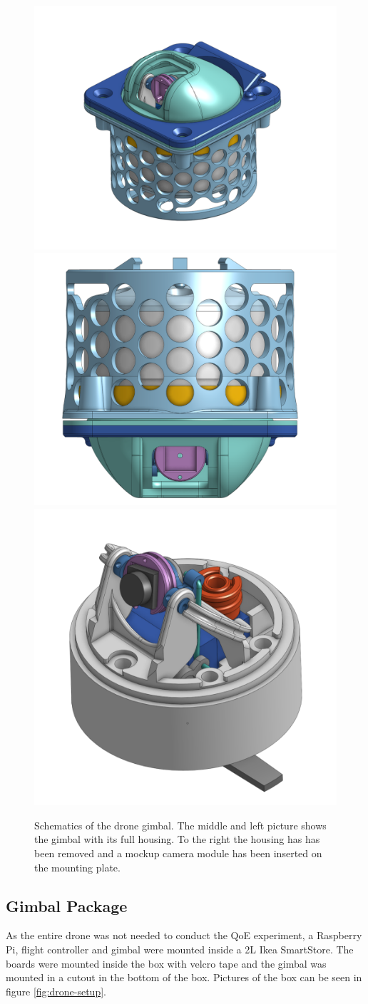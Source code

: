 \documentclass[nofilelist]{cslthse-msc}
\begin{document}
\begin{description}
   \begin{figure}[htp]
      \centering
      \includegraphics[width=.3\textwidth]{images/gimbal-1.png}\hfill
      \includegraphics[width=.3\textwidth]{images/gimbal-2.png}\hfill
      \includegraphics[width=.3\textwidth]{images/gimbal-3.png}
      \caption{Schematics of the drone gimbal. The middle and left picture shows the gimbal with its full housing. To the right the housing has has been removed and a mockup camera module has been inserted on the mounting plate.}
      \label{fig:gimbal-pics}
   \end{figure}
\end{description}
   
\subsection{Gimbal Package}
As the entire drone was not needed to conduct the QoE experiment, a Raspberry Pi, flight controller and gimbal were mounted inside a 2L Ikea SmartStore. The boards were mounted inside the box with velcro tape and the gimbal was mounted in a cutout in the bottom of the box. Pictures of the box can be seen in figure \ref{fig:drone-setup}.
\end{document}
